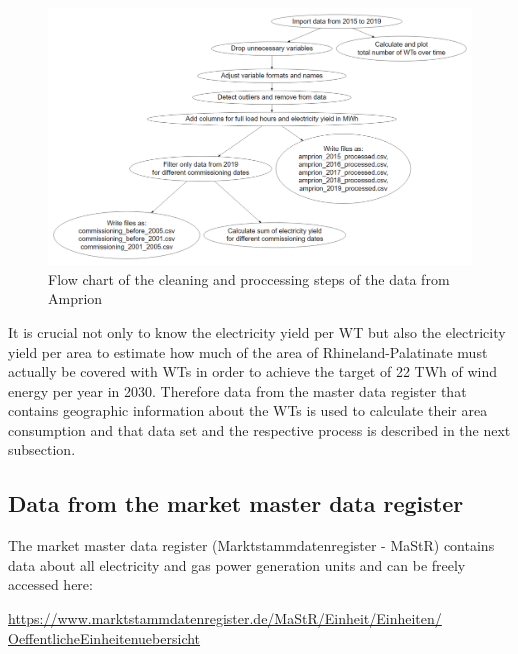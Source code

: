 \documentclass[a4paper,11pt]{article}
\begin{document}
\begin{figure}[H]

{\centering \includegraphics[width=1\linewidth]{data/Amprion/results_of_preparation/prepflow} 

}

\caption{Flow chart of the cleaning and proccessing steps of the data from Amprion}\label{fig:preparation}
\end{figure}
It is crucial not only to know the electricity yield per WT but also the electricity yield per area to estimate how much of the area of Rhineland-Palatinate must actually be covered with WTs in order to achieve the target of 22 TWh of wind energy per year in 2030. Therefore data from the master data register that contains geographic information about the WTs is used to calculate their area consumption and that data set and the respective process is described in the next subsection.

\hypertarget{data-from-the-market-master-data-register}{%
\subsection{Data from the market master data register}\label{data-from-the-market-master-data-register}}

The market master data register (Marktstammdatenregister - MaStR) contains data about all electricity and gas power generation units and can be freely accessed here:

\href{https://www.marktstammdatenregister.de/MaStR/Einheit/Einheiten/OeffentlicheEinheitenuebersicht}{https://www.marktstammdatenregister.de/MaStR/Einheit/Einheiten/
OeffentlicheEinheitenuebersicht}
\end{document}
